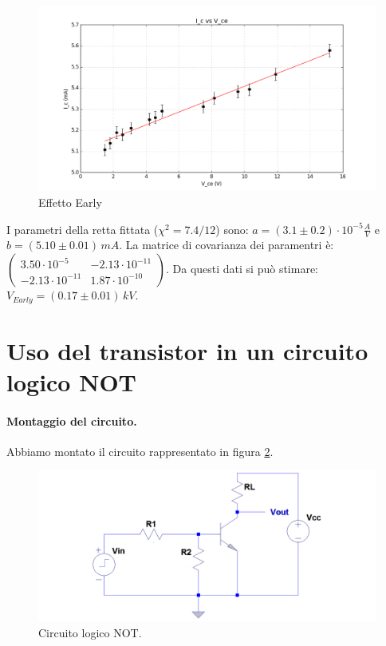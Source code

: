 \documentclass[10pt,a4paper]{article}
\begin{document}
\begin{figure}[!htb]
  \centering
  \includegraphics[scale=0.5]{Early.png} 
\caption{Effetto Early} \label{early}
\end{figure}

I parametri della retta fittata ($\chi^2 = 7.4/12$)  sono: $a = (3.1 \pm 0.2) \cdot 10^{-5} \frac{A}{V}$ e $b = (5.10 \pm 0.01)\, mA$. La matrice di covarianza dei paramentri è: $\left( 
\begin{array}{cc}
3.50\cdot 10^{-5} & -2.13\cdot 10^{-11} \\ 
-2.13\cdot 10^{-11} & 1.87 \cdot 10^{-10}
\end{array} \right)$.
Da questi dati si può stimare: $V_{Early} = (0.17 \pm 0.01) \, kV$.


 
\section{Uso del transistor in un circuito logico NOT }
\paragraph{Montaggio del circuito.}
Abbiamo montato il circuito rappresentato in  figura \ref{circuito2}.

\begin{figure}[!htb]
  \centering
  \includegraphics[scale=0.4]{circuito2} 
\caption{Circuito logico NOT.} \label{circuito2}
\end{figure} 
\end{document}
